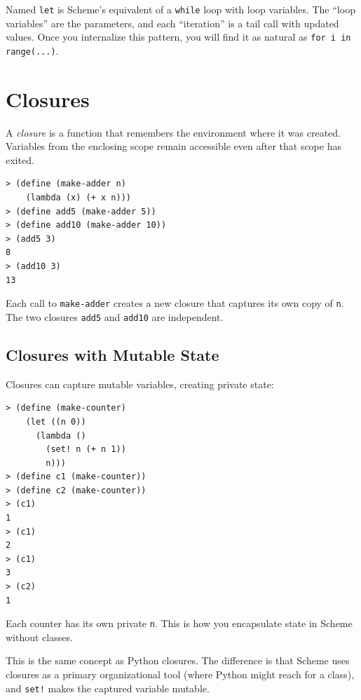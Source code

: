 \begin{note}
Named \texttt{let} is Scheme's equivalent of a \texttt{while} loop with loop variables. The ``loop variables'' are the parameters, and each ``iteration'' is a tail call with updated values. Once you internalize this pattern, you will find it as natural as \texttt{for i in range(...)}.
\end{note}

\section{Closures}

A \emph{closure} is a function that remembers the environment where it was created. Variables from the enclosing scope remain accessible even after that scope has exited.

\begin{lstlisting}[style=repl]
> (define (make-adder n)
    (lambda (x) (+ x n)))
> (define add5 (make-adder 5))
> (define add10 (make-adder 10))
> (add5 3)
8
> (add10 3)
13
\end{lstlisting}

Each call to \texttt{make-adder} creates a new closure that captures its own copy of \texttt{n}. The two closures \texttt{add5} and \texttt{add10} are independent.

\subsection{Closures with Mutable State}

Closures can capture mutable variables, creating private state:

\begin{lstlisting}[style=repl]
> (define (make-counter)
    (let ((n 0))
      (lambda ()
        (set! n (+ n 1))
        n)))
> (define c1 (make-counter))
> (define c2 (make-counter))
> (c1)
1
> (c1)
2
> (c1)
3
> (c2)
1
\end{lstlisting}

Each counter has its own private \texttt{n}. This is how you encapsulate state in Scheme without classes.

\begin{note}
This is the same concept as Python closures. The difference is that Scheme uses closures as a primary organizational tool (where Python might reach for a class), and \texttt{set!} makes the captured variable mutable.
\end{note}

